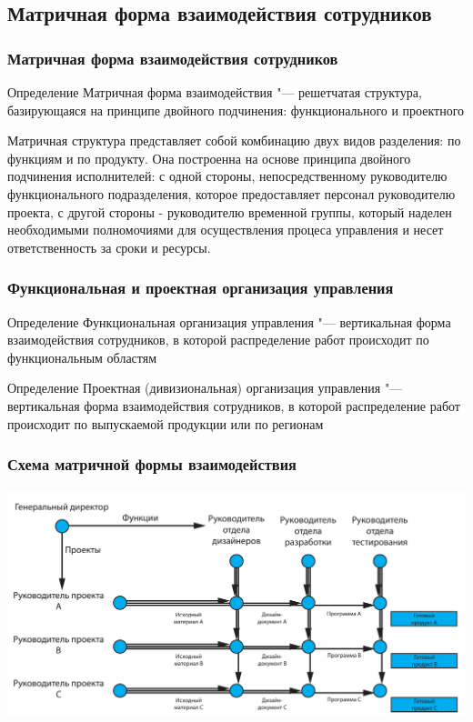 \documentclass{../industrial-development}
\begin{document}
\subsection{Матричная форма взаимодействия сотрудников}

\begin{frame} \frametitle{Матричная форма взаимодействия сотрудников}
  \begin{block}{Определение}
	\alert{Матричная форма взаимодействия} "--- решетчатая структура, базирующаяся на принципе  двойного подчинения: функционального и проектного
  \end{block}
\end{frame}

\lecturenotes
Матричная структура представляет собой комбинацию двух видов разделения: по функциям и по продукту. Она построенна на основе принципа двойного подчинения исполнителей: с одной стороны, непосредственному руководителю функционального подразделения, которое предоставляет персонал руководителю проекта, с другой стороны  - руководителю временной группы, который наделен необходимыми полномочиями для осуществления процеса управления и несет ответственность за сроки и ресурсы.

\begin{frame} \frametitle{Функциональная и проектная организация управления}
	\begin{block}{Определение}
		\alert{Функциональная организация управления} "--- вертикальная форма взаимодействия сотрудников, в которой распределение работ происходит по функциональным областям
	\end{block}
	\begin{block}{Определение}
		\alert{Проектная (дивизиональная) организация управления} "--- вертикальная форма взаимодействия сотрудников, в которой распределение работ происходит по выпускаемой продукции или по регионам
	\end{block}
\end{frame}

\begin{frame} \frametitle{Схема матричной формы взаимодействия}

\begin{block}{}
	\centerline{\includegraphics[width=1\textwidth]{matrix.pdf}}
\end{block}

\end{frame}
\end{document}
